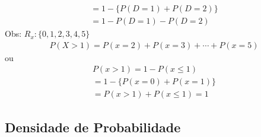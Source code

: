 \documentclass[11pt,a4paper]{book}
\begin{document}
\begin{description}
\begin{enumerate}[label=(\alph*)]
\begin{align*}
             = 1- \{ P(D=1)+ P(D=2) \}\\
             = 1- P(D=1)- P(D=2)
           \end{align*}
           Obs: $R_{x}: \{0,1,2,3,4,5 \}$
           \begin{align*}
             P(X>1)=P(x=2)+ P(x=3)+\cdots+P(x=5)
           \end{align*}
           ou
           \begin{align*}
             P(x>1)= 1-P(x\le 1)\\
             = 1- \{ P(x=0)+ P(x=1) \}\\
             = P(x>1)+ P(x\le 1)=1
           \end{align*}
       \end{enumerate}
   \end{description}
   \subsection{Densidade de Probabilidade}
\end{document}
